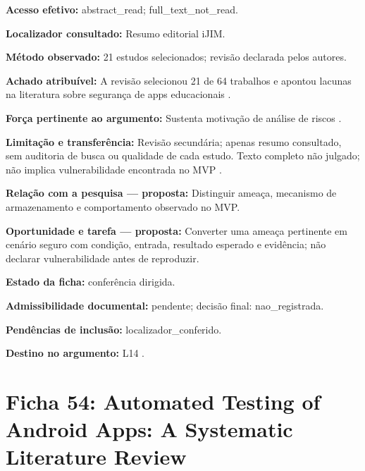 \noindent\textbf{Acesso efetivo:} abstract\_read; full\_text\_not\_read.\par\medskip

\noindent\textbf{Localizador consultado:} Resumo editorial iJIM.\par\medskip

\noindent\textbf{Método observado:} 21 estudos selecionados; revisão declarada pelos autores.\par\medskip

\noindent\textbf{Achado atribuível:} A revisão selecionou 21 de 64 trabalhos e apontou lacunas na literatura sobre segurança de apps educacionais \citep{OS18}.\par\medskip

\noindent\textbf{Força pertinente ao argumento:} Sustenta motivação de análise de riscos \citep{OS18}.\par\medskip

\noindent\textbf{Limitação e transferência:} Revisão secundária; apenas resumo consultado, sem auditoria de busca ou qualidade de cada estudo. Texto completo não julgado; não implica vulnerabilidade encontrada no MVP \citep{OS18}.\par\medskip

\noindent\textbf{Relação com a pesquisa — proposta:} Distinguir ameaça, mecanismo de armazenamento e comportamento observado no MVP.\par\medskip

\noindent\textbf{Oportunidade e tarefa — proposta:} Converter uma ameaça pertinente em cenário seguro com condição, entrada, resultado esperado e evidência; não declarar vulnerabilidade antes de reproduzir.\par\medskip

\noindent\textbf{Estado da ficha:} conferência dirigida.\par\medskip

\noindent\textbf{Admissibilidade documental:} pendente; decisão final: nao\_registrada.\par\medskip

\noindent\textbf{Pendências de inclusão:} localizador\_conferido.\par\medskip

\noindent\textbf{Destino no argumento:} L14 .

\clearpage\section*{Ficha 54: Automated Testing of Android Apps: A Systematic Literature Review}

